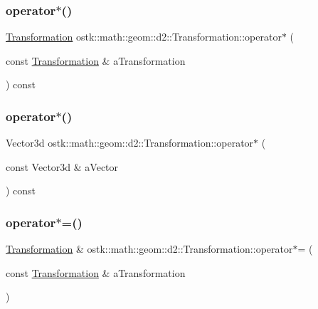 \subsubsection{\texorpdfstring{operator$\ast$()}{operator*()}\hspace{0.1cm}{\footnotesize\ttfamily [1/2]}}
{\footnotesize\ttfamily \hyperlink{classostk_1_1math_1_1geom_1_1d2_1_1_transformation}{Transformation} ostk\+::math\+::geom\+::d2\+::\+Transformation\+::operator$\ast$ (\begin{DoxyParamCaption}\item[{const \hyperlink{classostk_1_1math_1_1geom_1_1d2_1_1_transformation}{Transformation} \&}]{a\+Transformation }\end{DoxyParamCaption}) const}

\mbox{\label{classostk_1_1math_1_1geom_1_1d2_1_1_transformation_aa276f9ef6cc38a77bc1843a34a48b15a}} 
\subsubsection{\texorpdfstring{operator$\ast$()}{operator*()}\hspace{0.1cm}{\footnotesize\ttfamily [2/2]}}
{\footnotesize\ttfamily Vector3d ostk\+::math\+::geom\+::d2\+::\+Transformation\+::operator$\ast$ (\begin{DoxyParamCaption}\item[{const Vector3d \&}]{a\+Vector }\end{DoxyParamCaption}) const}

\mbox{\label{classostk_1_1math_1_1geom_1_1d2_1_1_transformation_a79edc1db9516dd543511e4103044535c}} 
\subsubsection{\texorpdfstring{operator$\ast$=()}{operator*=()}}
{\footnotesize\ttfamily \hyperlink{classostk_1_1math_1_1geom_1_1d2_1_1_transformation}{Transformation} \& ostk\+::math\+::geom\+::d2\+::\+Transformation\+::operator$\ast$= (\begin{DoxyParamCaption}\item[{const \hyperlink{classostk_1_1math_1_1geom_1_1d2_1_1_transformation}{Transformation} \&}]{a\+Transformation }\end{DoxyParamCaption})}

